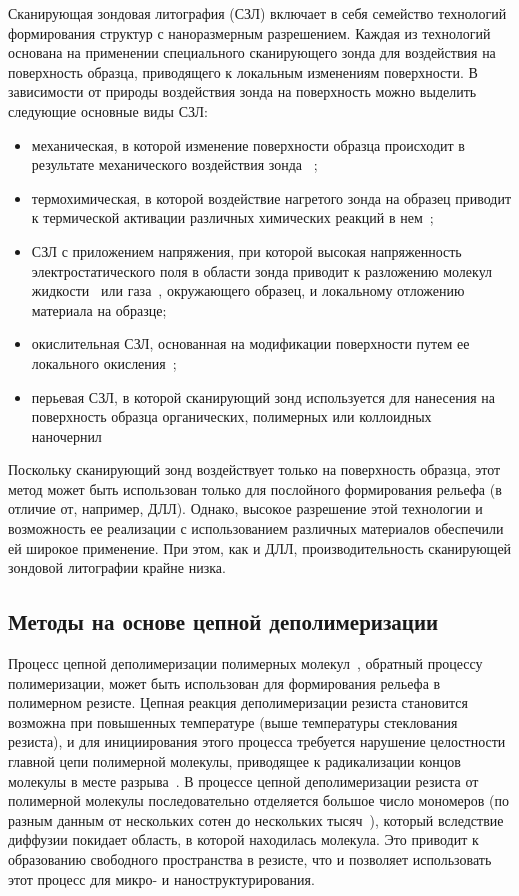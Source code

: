Сканирующая зондовая литография (СЗЛ) включает в себя семейство технологий формирования структур с наноразмерным разрешением. Каждая из технологий основана на применении специального сканирующего зонда для воздействия на поверхность образца, приводящего к локальным изменениям поверхности. В зависимости от природы воздействия зонда на поверхность можно выделить следующие основные виды СЗЛ:
\begin{itemize}
	\item механическая, в которой изменение поверхности образца происходит в результате механического воздействия зонда ~\cite{SPL_mechanical};
	\item  термохимическая, в которой воздействие нагретого зонда на образец приводит к термической активации различных химических реакций в нем~\cite{SPL_termochemical};
	\item СЗЛ с приложением напряжения, при которой высокая напряженность электростатического поля в области зонда приводит к разложению молекул жидкости~\cite{SPL_bias_liquid} или газа~\cite{SPL_bias_gas}, окружающего образец, и локальному отложению материала на образце;
	\item окислительная СЗЛ, основанная на модификации поверхности путем ее локального окисления~\cite{SPL_oxidation};
	\item перьевая СЗЛ, в которой сканирующий зонд используется для нанесения на поверхность образца органических, полимерных или коллоидных наночернил~\cite{SPL_dip_pen_1, SPL_dip_pen_2}
\end{itemize}

Поскольку сканирующий зонд воздействует только на поверхность образца, этот метод может быть использован только для послойного формирования рельефа (в отличие от, например, ДЛЛ). Однако, высокое разрешение этой технологии и возможность ее реализации с использованием различных материалов обеспечили ей широкое применение. При этом, как и ДЛЛ, производительность сканирующей зондовой литографии крайне низка.


\subsection{Методы на основе цепной деполимеризации}

Процесс цепной деполимеризации полимерных молекул~\cite{depol_general_1}, обратный процессу полимеризации, может быть использован для формирования рельефа в полимерном резисте. Цепная реакция деполимеризации резиста становится возможна при повышенных температуре (выше температуры стеклования резиста), и для инициирования этого процесса требуется нарушение целостности главной цепи полимерной молекулы, приводящее к радикализации концов молекулы в месте разрыва~\cite{depol_general_2}. В процессе цепной деполимеризации резиста от полимерной молекулы последовательно отделяется большое число мономеров (по разным данным от нескольких сотен до нескольких тысяч~\cite{Cowley_1952_1, Mita_PMMA_zip_lengths_T, Inaba_zip_len}), который вследствие диффузии покидает область, в которой находилась молекула. Это приводит к образованию свободного пространства в резисте, что и позволяет использовать этот процесс для микро- и наноструктурирования.

